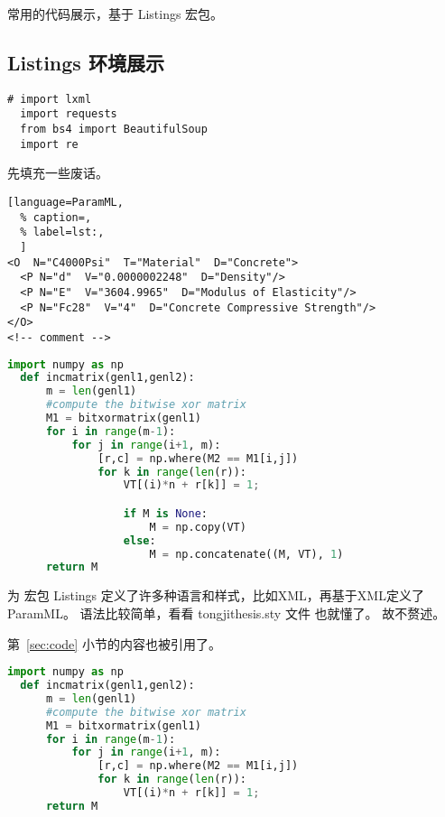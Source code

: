 \documentclass[UTF8,AutoFakeBold,zihao=-4,scheme=chinese]{ctexart}
\begin{document}
常用的代码展示，基于 Listings 宏包。

\subsection{Listings 环境展示}
\label{ssc:listings}

\begin{lstlisting}[style=monocolor,
  caption={first lst env},
  label={no label},
  name=测试第一个代码,
  language=PythonPlus]
  # import lxml
  import requests
  from bs4 import BeautifulSoup
  import re
\end{lstlisting}

先填充一些废话。\zhlipsum[8]

\begin{lstlisting}[language=ParamML,
  % caption=,
  % label=lst:,
  ]
<O  N="C4000Psi"  T="Material"  D="Concrete">
  <P N="d"  V="0.0000002248"  D="Density"/>
  <P N="E"  V="3604.9965"  D="Modulus of Elasticity"/>
  <P N="Fc28"  V="4"  D="Concrete Compressive Strength"/>
</O>
<!-- comment -->
\end{lstlisting}

\begin{lstlisting}[language=Python,
  caption=Second CODE Block,
  label=lst:2nd,
  style=colored]
  import numpy as np
  def incmatrix(genl1,genl2):
      m = len(genl1)
      #compute the bitwise xor matrix
      M1 = bitxormatrix(genl1)
      for i in range(m-1):
          for j in range(i+1, m):
              [r,c] = np.where(M2 == M1[i,j])
              for k in range(len(r)):
                  VT[(i)*n + r[k]] = 1;

                  if M is None:
                      M = np.copy(VT)
                  else:
                      M = np.concatenate((M, VT), 1)
      return M
\end{lstlisting}

为 宏包 Listings 定义了许多种语言和样式，比如XML，再基于XML定义了 ParamML。
语法比较简单，看看 tongjithesis.sty 文件 也就懂了。
故不赘述。

第~\ref{sec:code} 小节的内容也被引用了。

\begin{lstlisting}[language=Python,
  caption=中文标题没有括号,
  label=lst:outer,
  style=colorEX]
  import numpy as np
  def incmatrix(genl1,genl2):
      m = len(genl1)
      #compute the bitwise xor matrix
      M1 = bitxormatrix(genl1)
      for i in range(m-1):
          for j in range(i+1, m):
              [r,c] = np.where(M2 == M1[i,j])
              for k in range(len(r)):
                  VT[(i)*n + r[k]] = 1;
      return M
\end{lstlisting}
\end{document}
